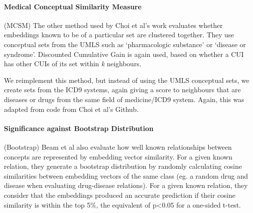 \documentclass[11pt,a4paper]{article}
\begin{document}
\paragraph{Medical Conceptual Similarity Measure}(MCSM) The other method used by Choi et al's work evaluates whether embeddings known to be of a particular set are clustered together. They use conceptual sets from the UMLS such as `pharmacologic substance' or `disease or syndrome'.  Discounted Cumulative Gain is again used, based on whether a CUI has other CUIs of its set within \emph{k} neighbours. 

We reimplement this method, but instead of using the UMLS conceptual sets, we create sets from the ICD9 systems, again giving a score to neighbours that are diseases or drugs from the same field of medicine/ICD9 system. Again, this was adapted from code from Choi et al's Github.  

%

\paragraph{Significance against Bootstrap Distribution}(Bootstrap)
Beam et al  also evaluate how well known relationships between concepts are represented by embedding vector similarity. For a given known relation, they generate a bootstrap distribution by randomly calculating cosine similarities between embedding vectors of the same class (eg. a random drug and disease when evaluating  drug-disease relations). For a given known relation, they consider that the embeddings produced an accurate prediction if their cosine similarity is within the top 5\%, the equivalent of p<0.05 for a one-sided t-test. 
\end{document}
